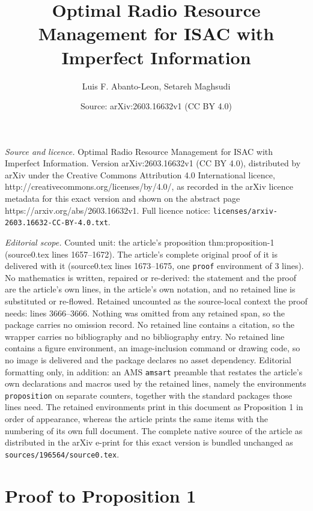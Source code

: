 \documentclass[10pt,a4paper]{amsart}
\title{\Huge Optimal Radio Resource Management for ISAC with Imperfect Information}
\author{Luis F. Abanto-Leon, Setareh Maghsudi}
\date{Source: arXiv:2603.16632v1 (CC BY 4.0)}
\begin{document}
\maketitle

\noindent\emph{Source and licence.} \Huge Optimal Radio Resource Management for ISAC with Imperfect Information. Version arXiv:2603.16632v1 (CC BY 4.0), distributed by arXiv under the Creative Commons Attribution 4.0 International licence, http://creativecommons.org/licenses/by/4.0/, as recorded in the arXiv licence metadata for this exact version and shown on the abstract page https://arxiv.org/abs/2603.16632v1. Full licence notice: \texttt{licenses/arxiv-2603.16632-CC-BY-4.0.txt}.\par\smallskip

\noindent\textit{Editorial scope.} Counted unit: the article's proposition thm:proposition-1 (source0.tex lines 1657--1672). The article's complete original proof of it is delivered with it (source0.tex lines 1673--1675, one \texttt{proof} environment of 3 lines). No mathematics is written, repaired or re-derived: the statement and the proof are the article's own lines, in the article's own notation, and no retained line is substituted or re-flowed.  Retained uncounted as the source-local context the proof needs: lines 3666--3666.  Nothing was omitted from any retained span, so the package carries no omission record.  No retained line contains a citation, so the wrapper carries no bibliography and no bibliography entry.  No retained line contains a figure environment, an image-inclusion command or drawing code, so no image is delivered and the package declares no asset dependency.  Editorial formatting only, in addition: an AMS \texttt{amsart} preamble that restates the article's own declarations and macros used by the retained lines, namely the environments \texttt{proposition} on separate counters, together with the standard packages those lines need.  The retained environments print in this document as Proposition 1 in order of appearance, whereas the article prints the same items with the numbering of its own full document.  The complete native source of the article as distributed in the arXiv e-print for this exact version is bundled unchanged as \texttt{sources/196564/source0.tex}.
\section{Proof to Proposition 1} \label{app:proof-proposition-1}
\end{document}
